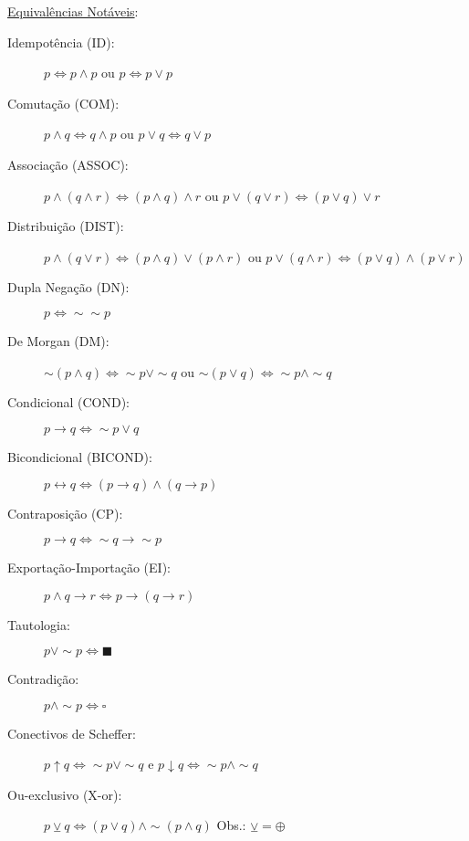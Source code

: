 \documentclass[12pt]{article}
\begin{document}
\underline{Equivalências Notáveis}:
\begin{description}
\item[Idempotência (ID):] $p\Leftrightarrow p\wedge p$ ou $p\Leftrightarrow p\vee p$
\item[Comutação (COM):] $p\wedge q\Leftrightarrow q\wedge p$ ou $p\vee q\Leftrightarrow q\vee p$
\item[Associação (ASSOC):] $p\wedge(q\wedge r)\Leftrightarrow (p\wedge q)\wedge r$ ou $p\vee(q\vee r)\Leftrightarrow (p\vee q)\vee r$ 
\item[Distribuição (DIST):] $p\wedge(q\vee r)\Leftrightarrow (p\wedge q)\vee (p \wedge r)$ ou $p\vee(q\wedge r)\Leftrightarrow (p\vee q)\wedge (p\vee r)$
\item[Dupla Negação (DN):] $p\Leftrightarrow\sim\sim p$
\item[De Morgan (DM):] $\sim(p \wedge q) \Leftrightarrow \sim p \vee\sim q$ ou $\sim(p \vee q) \Leftrightarrow \sim p \wedge\sim q$
\item[Condicional (COND):] $p\rightarrow q \Leftrightarrow\sim p \vee q$

\item[Bicondicional (BICOND):] $p\leftrightarrow q \Leftrightarrow (p\rightarrow q)\wedge(q\rightarrow p)$

\item[Contraposição (CP):] $p\rightarrow q \Leftrightarrow \sim q\rightarrow\sim p$

\item[Exportação-Importação (EI):] $p\wedge q\rightarrow r \Leftrightarrow p\rightarrow(q\rightarrow r)$

\item[Tautologia:] $p\vee \sim p \Leftrightarrow  \blacksquare  $

\item[Contradição:] $ p\wedge \sim p \Leftrightarrow \square $

\item[Conectivos de Scheffer:] $p \uparrow q \Leftrightarrow \sim p \vee \sim q$ e $p \downarrow q \Leftrightarrow \sim p \wedge \sim q$ 

\item[Ou-exclusivo (X-or):] $p \veebar q \Leftrightarrow (p \vee q) \wedge\sim (p \wedge q)$ Obs.: $\veebar = \oplus$

\end{description}
%
\end{document}
